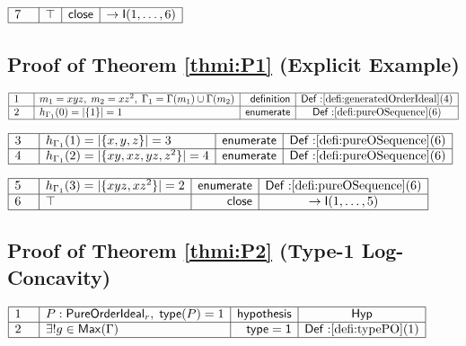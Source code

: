 \documentclass[11pt,reqno]{amsart}
\begin{document}
\nointerlineskip\noindent$%
\begin{array}{|m{0.5cm}|l|r|c|}
\hline
7 & \top & \mathsf{close} & \to\mathsf{I}(1,\dots,6) \\ \hline
\end{array}%
$

\medskip

\subsection*{Proof of Theorem \protect\ref{thmi:P1} (Explicit Example)}

\noindent $%
\begin{array}{|m{0.5cm}|l|r|c|}
\hline
1 & m_{1}=xyz,\;m_{2}=xz^{2},\;\Gamma _{1}=\Gamma (m_{1})\cup \Gamma (m_{2})
& \mathsf{definition} & \mathsf{Def:}\ref{defi:generatedOrderIdeal}(4) \\ 
\hline
2 & h_{\Gamma _{1}}(0)=|\{1\}|=1 & \mathsf{enumerate} & \mathsf{Def:}\ref%
{defi:pureOSequence}(6) \\ \hline
\end{array}%
$

\nointerlineskip\noindent$%
\begin{array}{|m{0.5cm}|l|r|c|}
\hline
3 & h_{\Gamma_{1}}(1)=|\{x,y,z\}|=3 & \mathsf{enumerate} & \mathsf{Def:}\ref%
{defi:pureOSequence}(6) \\ \hline
4 & h_{\Gamma_{1}}(2)=|\{xy,xz,yz,z^{2}\}|=4 & \mathsf{enumerate} & \mathsf{%
Def:}\ref{defi:pureOSequence}(6) \\ \hline
\end{array}%
$

\nointerlineskip\noindent$%
\begin{array}{|m{0.5cm}|l|r|c|}
\hline
5 & h_{\Gamma_{1}}(3)=|\{xyz,xz^{2}\}|=2 & \mathsf{enumerate} & \mathsf{Def:}%
\ref{defi:pureOSequence}(6) \\ \hline
6 & \top & \mathsf{close} & \to\mathsf{I}(1,\dots,5) \\ \hline
\end{array}%
$

\medskip

\subsection*{Proof of Theorem \protect\ref{thmi:P2} (Type-1 Log-Concavity)}

\noindent $%
\begin{array}{|m{0.5cm}|l|r|c|}
\hline
1 & P:\mathsf{PureOrderIdeal}_{r},\;\mathsf{type}(P)=1 & \mathsf{hypothesis}
& \mathsf{Hyp} \\ \hline
2 & \exists !g\in \mathsf{Max}(\Gamma ) & \mathsf{type=1} & \mathsf{Def:}\ref%
{defi:typePO}(1) \\ \hline
\end{array}%
$
\end{document}
